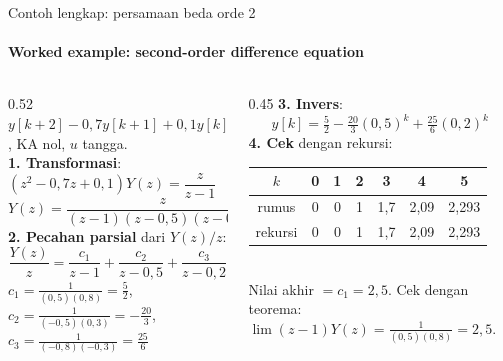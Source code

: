 \documentclass[aspectratio=169,10pt]{beamer}
\begin{document}
\begin{frame}{Contoh lengkap: persamaan beda orde 2}
	\framesubtitle{Worked example: second-order difference equation}
	\begin{columns}[T]
		\begin{column}{0.52\textwidth}
			\small
			$y[k+2] - 0{,}7y[k+1] + 0{,}1y[k] = u[k]$, KA nol, $u$ tangga.\\[3pt]
			\textbf{1. Transformasi}: $(z^2 - 0{,}7z + 0{,}1)Y(z) = \dfrac{z}{z-1}$
			\[
				Y(z) = \frac{z}{(z-1)(z-0{,}5)(z-0{,}2)}
			\]
			\textbf{2. Pecahan parsial} dari $Y(z)/z$:
			\[
				\frac{Y(z)}{z} = \frac{c_1}{z-1} + \frac{c_2}{z-0{,}5} + \frac{c_3}{z-0{,}2}
			\]
			$c_1 = \frac{1}{(0{,}5)(0{,}8)} = \frac{5}{2}$,\ \
			$c_2 = \frac{1}{(-0{,}5)(0{,}3)} = -\frac{20}{3}$,\ \
			$c_3 = \frac{1}{(-0{,}8)(-0{,}3)} = \frac{25}{6}$
		\end{column}
		\begin{column}{0.45\textwidth}
			\small
			\textbf{3. Invers}:
			\[
				y[k] = \tfrac{5}{2} - \tfrac{20}{3}(0{,}5)^k + \tfrac{25}{6}(0{,}2)^k
			\]
			\textbf{4. Cek} dengan rekursi:\\[2pt]
			\scriptsize
			\begin{tabular}{@{}c c c c c c c@{}}
				\toprule
				$k$ & 0 & 1 & 2 & 3 & 4 & 5 \\
				\midrule
				rumus & 0 & 0 & 1 & 1,7 & 2,09 & 2,293 \\
				rekursi & 0 & 0 & 1 & 1,7 & 2,09 & 2,293 \\
				\bottomrule
			\end{tabular}\\[4pt]
			\small Nilai akhir $=c_1 = 2{,}5$. Cek dengan teorema: $\lim (z-1)Y(z) = \frac{1}{(0{,}5)(0{,}8)} = 2{,}5$.
		\end{column}
	\end{columns}
\end{frame}
\end{document}
